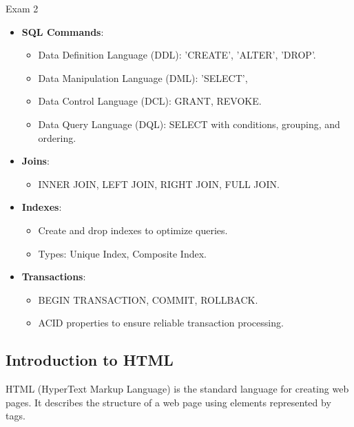 \begin{examnotes}{Exam 2}
\begin{highlight}
        \begin{itemize}
            \item \textbf{SQL Commands}:
                \begin{itemize}
                        \item Data Definition Language (DDL): 'CREATE', 'ALTER', 'DROP'.
                        \item Data Manipulation Language (DML): 'SELECT',
                        \item Data Control Language (DCL): GRANT, REVOKE.
                        \item Data Query Language (DQL): SELECT with conditions, grouping, and ordering.
                    \end{itemize}
                        \item \textbf{Joins}:
                    \begin{itemize}
                        \item INNER JOIN, LEFT JOIN, RIGHT JOIN, FULL JOIN.
                    \end{itemize}
                        \item \textbf{Indexes}:
                    \begin{itemize}
                        \item Create and drop indexes to optimize queries.
                        \item Types: Unique Index, Composite Index.
                    \end{itemize}
                        \item \textbf{Transactions}:
                    \begin{itemize}
                        \item BEGIN TRANSACTION, COMMIT, ROLLBACK.
                        \item ACID properties to ensure reliable transaction processing.
                    \end{itemize}
        \end{itemize}
    \end{highlight}

    \subsection*{Introduction to HTML}

    HTML (HyperText Markup Language) is the standard language for creating web pages. It describes the structure of a web page using elements represented by tags.
    

\end{examnotes}

